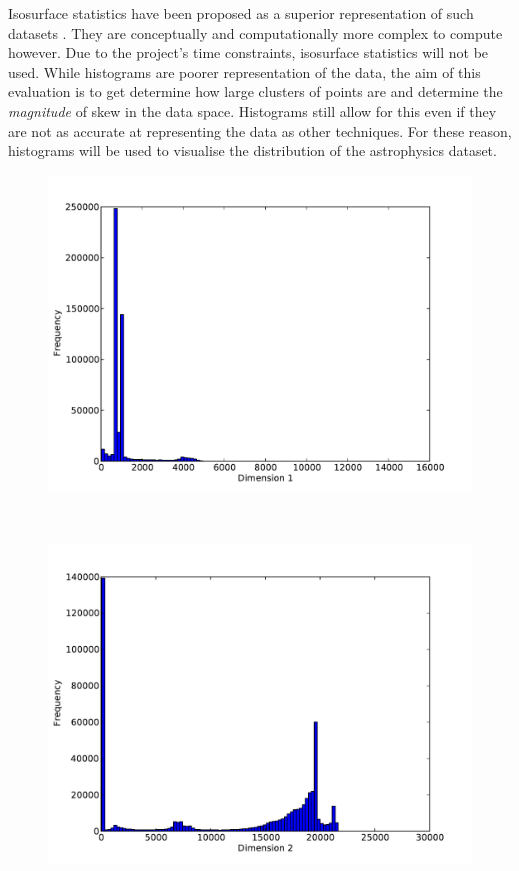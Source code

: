 Isosurface statistics have been proposed as a superior representation of such datasets \cite{histograms-and-isosurfaces}. They are conceptually and computationally more complex to compute however. Due to the project's time constraints, isosurface statistics will not be used. While histograms are poorer representation of the data, the aim of this evaluation is to get determine how large clusters of points are and determine the \textit{magnitude} of skew in the data space. Histograms still allow for this even if they are not as accurate at representing the data as other techniques. For these reason, histograms will be used to visualise the distribution of the astrophysics dataset.

\begin{figure}
	\begin{center}
		\begin{subfloat}{%
			\includegraphics[scale=0.36]{figures/histograms/astrophysics_500000_0.pdf}
		}
		\end{subfloat}~
		\begin{subfloat}{%
			\includegraphics[scale=0.36]{figures/histograms/astrophysics_500000_1.pdf}
		}
		\end{subfloat}
	\end{center}


\end{figure}
